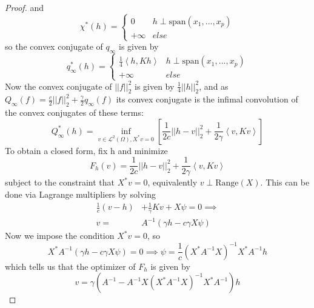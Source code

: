 \documentclass[ejsv2,preprint]{imsart}
\newcommand{\inprod}[2]{\left\langle #1,#2\right\rangle}
\newcommand{\norm}[1]{\left|\left|  #1 \right| \right|}
\newcommand{\SPAN}[1]{\text{span}\left(#1\right)}
\begin{document}
\begin{proof}
and 
\begin{equation}
        \chi^*(h) = \begin{cases}
            0&h \perp \SPAN{x_1,...,x_p}\\
            +\infty &else
        \end{cases}
\end{equation}
so the convex conjugate of $q_\infty$ is given by
\begin{equation}
    q^*_{\infty}(h) = \begin{cases}
        \frac{1}{4}\inprod{h}{Kh} & h\perp \SPAN{x_1,...,x_p}\\
        +\infty & else
    \end{cases}
\end{equation}
Now the convex conjugate of $\norm{f}_2^2$ is given by $\frac{1}{4}\norm{h}_2^2$, and as $Q_\infty(f)=\frac{c}{2}\norm{f}_2^2+\frac{\gamma}{2}q_\infty(f)$ its convex conjugate is the infimal convolution of the convex conjugates of these terms:
\begin{equation}
    Q^*_{\infty}(h) = \underset{v\in \mathcal{L}^2(\Omega), X^*v=0}{\inf}\left[ \frac{1}{2c}\norm{h-v}_2^2 + \frac{1}{2\gamma}\inprod{v}{Kv}\right]
\end{equation}
To obtain a closed form, fix h and minimize
\begin{equation}
    \label{eq:minFhv}
    F_h(v) = \frac{1}{2c}\norm{h-v}_2^2 + \frac{1}{2\gamma}\inprod{v}{Kv}
\end{equation}
subject to the constraint that $X^*v=0$, equivalently $v\perp \text{Range}(X)$. This can be done via Lagrange multipliers by solving
\begin{equation}\label{eq:v_soln}
\begin{split}
    \frac{1}{c}(v-h)&+\frac{1}{\gamma}Kv+X\psi = 0\implies \\
    v =& A^{-1}\left(\gamma h-c\gamma X\psi\right)
    \end{split}
\end{equation}%
Now we impose the condition $X^*v=0$, so 
\begin{equation}
    X^*A^{-1}\left(\gamma h-c\gamma X\psi\right)=0 \implies \psi = \frac{1}{c}\left(X^*A^{-1}X\right)^{-1}X^*A^{-1}h
\end{equation}
which tells us that the optimizer of $F_h$ is given by
\begin{equation}
    \label{eq:vmin}
    v=\gamma\left(A^{-1}-A^{-1}X(X^*A^{-1}X)^{-1}X^*A^{-1}\right)h
\end{equation}

\end{proof}
\end{document}
